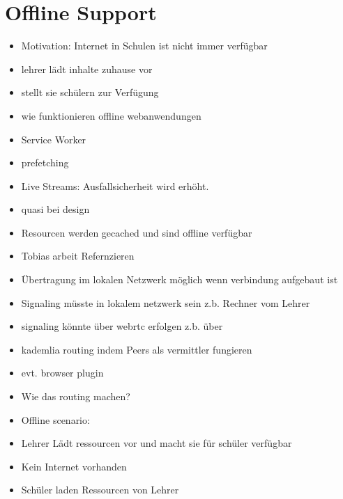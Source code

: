 \section{Offline Support}
\begin{itemize}
	\item Motivation: Internet in Schulen ist nicht immer verfügbar
	\item lehrer lädt inhalte zuhause vor
	\item stellt sie schülern zur Verfügung
	\item wie funktionieren offline webanwendungen
	\item Service Worker
	\item prefetching
	\item Live Streams: Ausfallsicherheit wird erhöht.
	\item quasi bei design
	\item Resourcen werden gecached und sind offline verfügbar
	\item Tobias arbeit Refernzieren
	\item Übertragung im lokalen Netzwerk möglich wenn verbindung aufgebaut ist
	\item Signaling müsste in lokalem netzwerk sein z.b. Rechner vom Lehrer
	\item signaling könnte über webrtc erfolgen z.b. über 
	\item kademlia routing indem Peers als vermittler fungieren
	\item 	evt. browser plugin
	\item 	Wie das routing machen?
	\item Offline scenario:
	\item 	Lehrer Lädt ressourcen vor und macht sie für schüler verfügbar
	\item 	Kein Internet vorhanden
	\item 	Schüler laden Ressourcen von Lehrer
\end{itemize}

